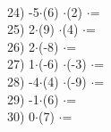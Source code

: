 \documentclass[a4paper,10pt]{article}
\begin{document}
\vspace{0.5cm}\\24)   -5$\cdot$(6) $\cdot$(2) $\cdot$=
\vspace{0.5cm}\\25)   2$\cdot$(9) $\cdot$(4) $\cdot$=
\vspace{0.5cm}\\26)   2$\cdot$(-8) $\cdot$=
\vspace{0.5cm}\\27)   1$\cdot$(-6) $\cdot$(-3) $\cdot$=
\vspace{0.5cm}\\28)   -4$\cdot$(4) $\cdot$(-9) $\cdot$=
\vspace{0.5cm}\\29)   -1$\cdot$(6) $\cdot$=
\vspace{0.5cm}\\30)   0$\cdot$(7) $\cdot$=
\vspace{0.5cm}\\\pagebreak
\end{document}
